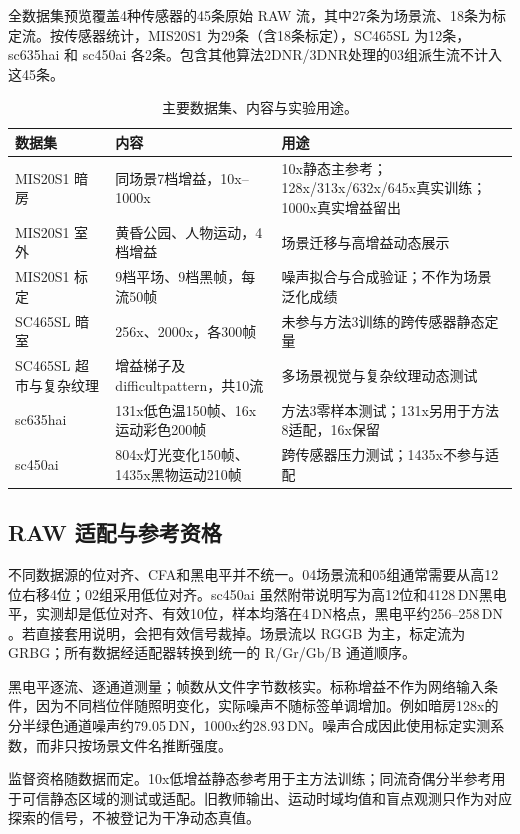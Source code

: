 \documentclass[11pt,a4paper,UTF8,fontset=fandol]{ctexart}
\newcommand{\dn}{\ensuremath{\,\mathrm{DN}}}
\begin{document}
全数据集预览覆盖4种传感器的45条原始 RAW 流，其中27条为场景流、18条为标定流。按传感器统计，MIS20S1 为29条（含18条标定），SC465SL 为12条，sc635hai 和 sc450ai 各2条。包含其他算法2DNR/3DNR处理的03组派生流不计入这45条。

\begin{table}[H]
\centering\small
\caption{主要数据集、内容与实验用途。}
\label{tab:dataset}
\begin{tabular}{p{}p{}p{}}
\toprule
数据集 & 内容 & 用途 \\
\midrule
MIS20S1 暗房 & 同场景7档增益，10x--1000x & 10x静态主参考；128x/313x/632x/645x真实训练；1000x真实增益留出 \\
MIS20S1 室外 & 黄昏公园、人物运动，4档增益 & 场景迁移与高增益动态展示 \\
MIS20S1 标定 & 9档平场、9档黑帧，每流50帧 & 噪声拟合与合成验证；不作为场景泛化成绩 \\
SC465SL 暗室 & 256x、2000x，各300帧 & 未参与方法3训练的跨传感器静态定量 \\
SC465SL 超市与复杂纹理 & 增益梯子及 difficultpattern，共10流 & 多场景视觉与复杂纹理动态测试 \\
sc635hai & 131x低色温150帧、16x运动彩色200帧 & 方法3零样本测试；131x另用于方法8适配，16x保留 \\
sc450ai & 804x灯光变化150帧、1435x黑物运动210帧 & 跨传感器压力测试；1435x不参与适配 \\
\bottomrule
\end{tabular}
\end{table}

\subsection{RAW 适配与参考资格}

不同数据源的位对齐、CFA和黑电平并不统一。04场景流和05组通常需要从高12位右移4位；02组采用低位对齐。sc450ai 虽然附带说明写为高12位和4128\dn 黑电平，实测却是低位对齐、有效10位，样本均落在4\dn 格点，黑电平约256--258\dn。若直接套用说明，会把有效信号裁掉。场景流以 RGGB 为主，标定流为 GRBG；所有数据经适配器转换到统一的 R/Gr/Gb/B 通道顺序。

黑电平逐流、逐通道测量；帧数从文件字节数核实。标称增益不作为网络输入条件，因为不同档位伴随照明变化，实际噪声不随标签单调增加。例如暗房128x的分半绿色通道噪声约79.05\dn，1000x约28.93\dn。噪声合成因此使用标定实测系数，而非只按场景文件名推断强度。

监督资格随数据而定。10x低增益静态参考用于主方法训练；同流奇偶分半参考用于可信静态区域的测试或适配。旧教师输出、运动时域均值和盲点观测只作为对应探索的信号，不被登记为干净动态真值。
\end{document}
